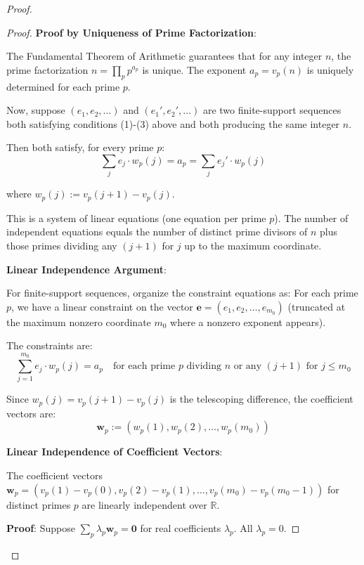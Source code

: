 \begin{proof}
\begin{theorem}
\begin{proof}
\noindent \textbf{Proof by Uniqueness of Prime Factorization}:

The Fundamental Theorem of Arithmetic guarantees that for any integer $n$, the prime factorization $n = \prod_p p^{a_p}$ is unique. The exponent $a_p = v_p(n)$ is uniquely determined for each prime $p$.

Now, suppose $(e_1, e_2, \ldots)$ and $(e_1', e_2', \ldots)$ are two finite-support sequences both satisfying conditions (1)-(3) above and both producing the same integer $n$.

Then both satisfy, for every prime $p$:
\begin{equation}
\sum_j e_j \cdot w_p(j) = a_p = \sum_j e_j' \cdot w_p(j)
\end{equation}

where $w_p(j) := v_p(j+1) - v_p(j)$.

This is a system of linear equations (one equation per prime $p$). The number of independent equations equals the number of distinct prime divisors of $n$ plus those primes dividing any $(j+1)$ for $j$ up to the maximum coordinate.

\noindent \textbf{Linear Independence Argument}:

For finite-support sequences, organize the constraint equations as: For each prime $p$, we have a linear constraint on the vector $\mathbf{e} = (e_1, e_2, \ldots, e_{m_0})$ (truncated at the maximum nonzero coordinate $m_0$ where a nonzero exponent appears).

The constraints are:
\begin{equation}
\sum_{j=1}^{m_0} e_j \cdot w_p(j) = a_p \quad \text{for each prime } p \text{ dividing } n \text{ or any } (j+1) \text{ for } j \leq m_0
\end{equation}

Since $w_p(j) = v_p(j+1) - v_p(j)$ is the telescoping difference, the coefficient vectors are:
\begin{equation}
\mathbf{w}_p := (w_p(1), w_p(2), \ldots, w_p(m_0))
\end{equation}

\noindent \textbf{Linear Independence of Coefficient Vectors}:

The coefficient vectors $\mathbf{w}_p = (v_p(1)-v_p(0), v_p(2)-v_p(1), \ldots, v_p(m_0)-v_p(m_0-1))$ for distinct primes $p$ are linearly independent over $\mathbb{R}$.

\noindent\textbf{Proof}: Suppose $\sum_p \lambda_p \mathbf{w}_p = \mathbf{0}$ for real coefficients $\lambda_p$. All $\lambda_p = 0$.


\end{proof}
\end{theorem}
\end{proof}
